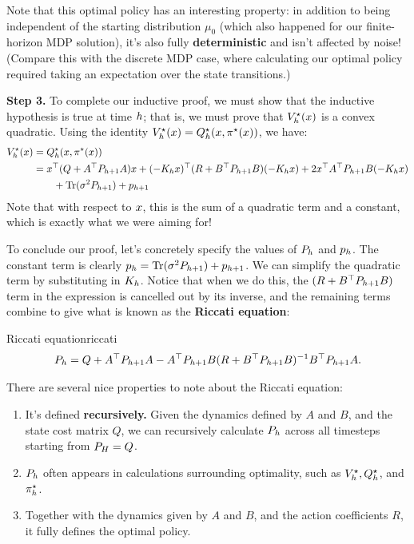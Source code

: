 \documentclass[../main/main]{subfiles}
\begin{document}
Note that this optimal policy has an interesting property: in addition to being
independent of the starting distribution $\mu_0$ (which also happened for our
finite-horizon MDP solution), it's also fully \textbf{deterministic} and isn't affected by noise!
(Compare this with the discrete MDP case, where calculating our optimal policy
required taking an expectation over the state transitions.)

\textbf{Step 3.} To complete our inductive proof, we must show that the
inductive hypothesis is true at time $h$; that is, we must prove that
$V^\star_h(x)$ is a convex quadratic.
Using the identity $V^\star_h(x) = Q^\star_h(x, \pi^\star(x))$, we have: \begin{align*}
    V^\star_h(x) &= Q^\star_h(x, \pi^\star(x)) \\
    &= x^\top (Q + A^\top P_{h+1} A) x + (-K_h x)^\top (R + B^\top P_{h+1} B) (-K_h x)
    + 2x^\top A^\top P_{h+1} B (-K_h x) \\
        &\qquad + \operatorname*{\textrm{Tr}}(\sigma^2 P_{h+1}) + p_{h+1}
\end{align*}
Note that with respect to $x$, this is the sum of a quadratic term and a constant,
which is exactly what we were aiming for!

To conclude our proof, let's concretely specify the values of $P_h$ and $p_h$.
The constant term is clearly $p_h = \operatorname*{\textrm{Tr}}(\sigma^2 P_{h+1}) + p_{h+1}$.
We can simplify the quadratic term by substituting in $K_h$.
Notice that when we do this, the $(R+B^\top P_{h+1} B)$ term in
the expression is cancelled out by its inverse, and the remaining terms combine to give
what is known as the \textbf{Riccati equation}:

\begin{definition}{Riccati equation}{riccati}
    \[
        P_h = Q + A^\top P_{h+1} A - A^\top P_{h+1} B (R + B^\top P_{h+1} B)^{-1} B^\top P_{h+1} A.
    \]
\end{definition}

There are several nice properties to note about the Riccati equation:
\begin{enumerate}
    \item It's defined \textbf{recursively.} Given the dynamics defined by $A$ and $B$, and the state cost matrix $Q$, we can
    recursively calculate $P_h$ across all timesteps starting from $P_H = Q$.
    \item $P_h$ often appears in calculations surrounding optimality, such as $V^\star_h, Q^\star_h$, and $\pi^\star_h$.
    \item Together with the dynamics given by $A$ and $B$, and the action coefficients $R$, it fully defines the optimal policy.
\end{enumerate}
\end{document}
